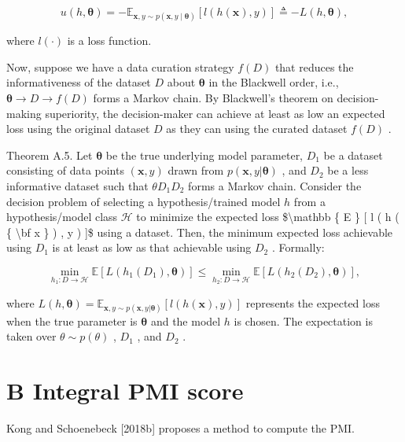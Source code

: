 \[
u ( h , \pmb \theta ) = - \mathbb { E } _ { \mathbf { x } , y \sim p ( \mathbf { x } , y \mid \pmb \theta ) } [ l ( h ( \mathbf { x } ) , y ) ] \triangleq - L ( h , \pmb \theta ) ,
\]

where \(l ( \cdot )\) is a loss function.

Now, suppose we have a data curation strategy \(f ( D )\) that reduces
the informativeness of the dataset \(D\) about \(\pmb \theta\) in the
Blackwell order, i.e., \(\pmb \theta \to D \to f ( D )\) forms a Markov
chain. By Blackwell's theorem on decision-making superiority, the
decision-maker can achieve at least as low an expected loss using the
original dataset \(D\) as they can using the curated dataset \(f ( D )\)
.

Theorem A.5. Let \(\pmb \theta\) be the true underlying model parameter,
\(D _ { 1 }\) be a dataset consisting of data points
\(( \mathbf { x } , y )\) drawn from
\(p ( \mathbf { x } , y | \pmb { \theta } )\) , and \(D _ { 2 }\) be a
less informative dataset such that \(\theta  D _ { 1 }  D _ { 2 }\)
forms a Markov chain. Consider the decision problem of selecting a
hypothesis/trained model \(h\) from a hypothesis/model class
\(\mathcal { H }\) to minimize the expected loss
{\$\textbackslash mathbb \{ E \} {[} l ( h ( \{ \textbackslash bf x \} )
, y ) {]}\$} using a dataset. Then, the minimum expected loss achievable
using \(D _ { 1 }\) is at least as low as that achievable using
\(D _ { 2 }\) . Formally:

\[
\operatorname* { m i n } _ { h _ { 1 } : D \to \mathcal { H } } \mathbb { E } [ L ( h _ { 1 } ( D _ { 1 } ) , \pmb { \theta } ) ] \le \operatorname* { m i n } _ { h _ { 2 } : D \to \mathcal { H } } \mathbb { E } [ L ( h _ { 2 } ( D _ { 2 } ) , \pmb { \theta } ) ] ,
\]

where
\(L ( h , \pmb \theta ) = \mathbb { E } _ { \mathbf { x } , y \sim p ( \mathbf x , y | \pmb \theta ) } [ l ( h ( \mathbf { x } ) , y ) ]\)
represents the expected loss when the true parameter is \(\pmb \theta\)
and the model \(h\) is chosen. The expectation is taken over
\(\theta \sim p ( \theta )\) , \(D _ { 1 }\) , and \(D _ { 2 }\) .

\section{B Integral PMI score}\label{b-integral-pmi-score}

Kong and Schoenebeck {[}2018b{]} proposes a method to compute the PMI.

